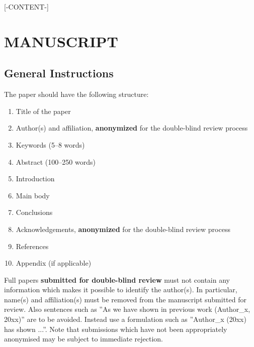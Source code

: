 \documentclass{isprs} %
\begin{document}
\maketitle


[-CONTENT-]

\section{MANUSCRIPT}\label{MANUSCRIPT}

\sloppy

\subsection{General Instructions}\label{sec:General Instructions}

The paper should have the following structure:

\begin{enumerate}
\setlength\itemsep{0em}\setlength\parskip{0em}\setlength\topsep{0em}\setlength\partopsep{0em}\setlength\parsep{0em}
\item{Title of the paper}
\item{Author(s) and affiliation, \textbf{anonymized} for the double-blind review process}
\item{Keywords (5--8 words)}
\item{Abstract (100--250 words)}
\item{Introduction}
\item{Main body}
\item{Conclusions}
\item{Acknowledgements,  \textbf{anonymized} for the double-blind review process}
\item{References}
\item{Appendix (if applicable)}
\end{enumerate}

Full papers \textbf{submitted for double-blind review} must not contain any information which makes it possible to identify the author(s). In particular, name(s) and affiliation(s) must be removed from the manuscript submitted for review. Also sentences such as ''As we have shown in previous work (Author\_x, 20xx)'' are to be avoided. Instead use a formulation such as ''Author\_x (20xx) has shown ...''. Note that submissions which have not been appropriately anonymised may be subject to immediate rejection.\\
\end{document}
